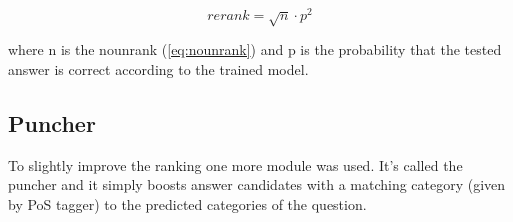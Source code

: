 \begin{equation}
rerank = \sqrt{n} \cdot p^2
\label{eq:rerank}
\end{equation}

where n is the nounrank (\ref{eq:nounrank}) and p is the probability that the tested answer is correct according 
to the trained model.

\subsection{Puncher}

To slightly improve the ranking one more module was used. It's called the puncher and it simply boosts 
answer candidates with a matching category (given by PoS tagger) to the predicted categories of the question. 